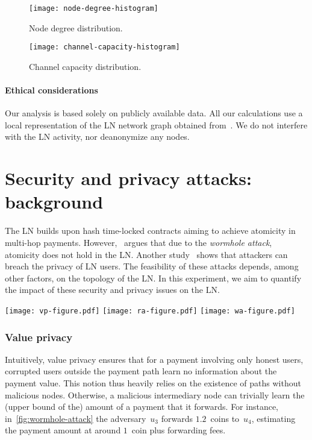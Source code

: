 \begin{figure}[tb]
	\centering
	\texttt{[image: node-degree-histogram]}
	\caption{Node degree distribution.}
	\label{fig:node-degree-histogram}
\end{figure}

\begin{figure}[tb]
	\centering
	\texttt{[image: channel-capacity-histogram]}
	\caption{Channel capacity distribution.}
	\label{fig:channel-capacity-histogram}
\end{figure}

\paragraph{Ethical considerations} 
Our analysis is based solely on publicly available data.
All our calculations use a local representation of the LN network graph obtained from~\cite{fiatjaf2020}.
We do not interfere with the LN activity, nor deanonymize any nodes.


\section{Security and privacy attacks: background}
\label{sec:sec-priv-attacks}

The LN builds upon hash time-locked contracts aiming to achieve atomicity in multi-hop payments.
However,~\cite{Malavolta2019} argues that due to the \emph{wormhole attack}, atomicity does not hold in the LN\@.
Another study~\cite{Malavolta2017} shows that attackers can breach the privacy of LN users.
The feasibility of these attacks depends, among other factors, on the topology of the LN\@.
In this experiment, we aim to quantify the impact of these security and privacy issues on the LN\@.

\begin{figure*}[tb]
	\texttt{[image: vp-figure.pdf]}
	\vspace{0.3cm}
	\texttt{[image: ra-figure.pdf]}
	\vspace{0.3cm}
	\texttt{[image: wa-figure.pdf]}
	\caption{An illustrative example of value privacy (top), relationship anonymity (middle), and the wormhole attack (bottom).}
	\label{fig:wormhole-attack}
\end{figure*}

\subsubsection*{Value privacy}
Intuitively, value privacy ensures that for a payment involving only honest users, corrupted users outside the payment path learn no information about the payment value.
This notion thus heavily relies on the existence of paths without malicious nodes.
Otherwise, a malicious intermediary node can trivially learn the (upper bound of the) amount of a payment that it forwards.
For instance, in~\cref{fig:wormhole-attack} the adversary~$u_3$ forwards $1.2$~coins to~$u_4$, estimating the payment amount at around $1$~coin plus forwarding fees.

